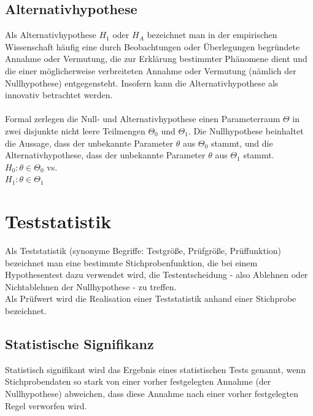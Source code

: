 \subsection{Alternativhypothese}
Als Alternativhypothese ${\displaystyle H_{1}}$ oder ${\displaystyle H_{A}}$ bezeichnet man in der empirischen Wissenschaft häufig eine durch Beobachtungen oder Überlegungen begründete Annahme oder Vermutung, die zur Erklärung bestimmter Phänomene dient und die einer möglicherweise verbreiteten Annahme oder Vermutung (nämlich der Nullhypothese) entgegensteht. Insofern kann die Alternativhypothese als innovativ betrachtet werden.\\
\\
Formal zerlegen die Null- und Alternativhypothese einen Parameterraum ${\displaystyle \Theta }$ in zwei disjunkte nicht leere Teilmengen ${\displaystyle \Theta _{0}}$ und ${\displaystyle \Theta _{1}}$. Die Nullhypothese beinhaltet die Aussage, dass der unbekannte Parameter ${\displaystyle \theta }$ aus ${\displaystyle \Theta _{0}}$ stammt, und die Alternativhypothese, dass der unbekannte Parameter ${\displaystyle \theta }$ aus ${\displaystyle \Theta _{1}}$ stammt.
\\
${\displaystyle H_{0}\colon \theta \in \Theta _{0}}$ vs. \\
${\displaystyle H_{1}\colon \theta \in \Theta _{1}}$  

\section{Teststatistik}
Als Teststatistik (synonyme Begriffe: Testgröße, Prüfgröße, Prüffunktion) bezeichnet man eine bestimmte Stichprobenfunktion, die bei einem Hypothesentest dazu verwendet wird, die Testentscheidung - also Ablehnen oder Nichtablehnen der Nullhypothese - zu treffen.\\
Als Prüfwert wird die Realisation einer Teststatistik anhand einer Stichprobe bezeichnet.
\subsection{Statistische Signifikanz}
Statistisch signifikant wird das Ergebnis eines statistischen Tests genannt, wenn Stichprobendaten so stark von einer vorher festgelegten Annahme (der Nullhypothese) abweichen, dass diese Annahme nach einer vorher festgelegten Regel verworfen wird.
